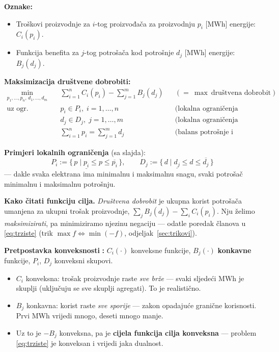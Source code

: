 \textbf{Oznake:}
\begin{itemize}
  \item Troškovi proizvodnje za $i$-tog proizvođača za proizvodnju $p_i$ [MWh]
        energije: $C_i(p_i)$.
  \item Funkcija benefita za $j$-tog potrošača kod potrošnje $d_j$ [MWh]
        energije: $B_j(d_j)$.
\end{itemize}

\textbf{Maksimizacija društvene dobrobiti:}
\begin{equation}
\label{eq:trziste}
\begin{aligned}
\min_{p_1,\dots,p_n,\,d_1,\dots,d_m} \quad
& \sum_{i=1}^{n}C_i(p_i) - \sum_{j=1}^{m}B_j(d_j)
  && (=\ \max\ \text{društvena dobrobit}) \\
\text{uz ogr.} \quad
& p_i \in P_i, \; i = 1,\dots,n
  && \text{(lokalna ograničenja proizvođača)} \\
& d_j \in D_j, \; j = 1,\dots,m
  && \text{(lokalna ograničenja potrošača)} \\
& \sum_{i=1}^{n}p_i = \sum_{j=1}^{m}d_j
  && \text{(balans potrošnje i proizvodnje)}
\end{aligned}
\end{equation}

\textbf{Primjeri lokalnih ograničenja} (sa slajda):
\[
P_i := \{\, p \mid \underline{p_i} \le p \le \overline{p_i} \,\}, \qquad
D_j := \{\, d \mid \underline{d_j} \le d \le \overline{d_j} \,\}
\]
--- dakle svaka elektrana ima minimalnu i maksimalnu snagu, svaki potrošač
minimalnu i maksimalnu potrošnju.

\textbf{Kako čitati funkciju cilja.} \emph{Društvena dobrobit} je ukupna korist
potrošača umanjena za ukupni trošak proizvodnje,
$\sum_j B_j(d_j) - \sum_i C_i(p_i)$. Nju želimo \emph{maksimizirati}, pa
minimiziramo njezinu negaciju --- odatle poredak članova u
\eqref{eq:trziste} (trik $\max f \Leftrightarrow \min(-f)$,
odjeljak~\ref{sec:trikovi}).

\textbf{Pretpostavka konveksnosti} \textbf{:} $C_i(\cdot)$ konveksne
funkcije, $B_j(\cdot)$ \textbf{konkavne} funkcije, $P_i$, $D_j$ konveksni
skupovi.

\begin{napomena}
\begin{itemize}
  \item $C_i$ konveksna: trošak proizvodnje raste \emph{sve brže} --- svaki
        sljedeći MWh je skuplji (uključuju se sve skuplji agregati). To je
        realistično.
  \item $B_j$ konkavna: korist raste \emph{sve sporije} --- zakon opadajuće
        granične korisnosti. Prvi MWh vrijedi mnogo, deseti mnogo manje.
  \item Uz to je $-B_j$ konveksna, pa je \textbf{cijela funkcija cilja
        konveksna} --- problem \eqref{eq:trziste} je konveksan i vrijedi jaka
        dualnost.
\end{itemize}
\end{napomena}

